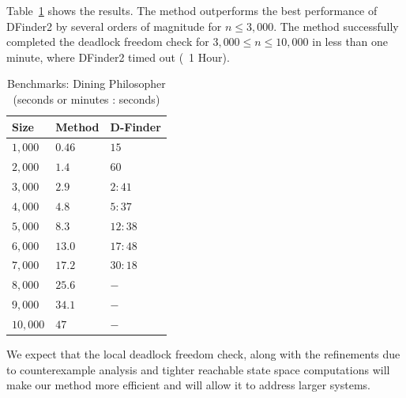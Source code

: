 Table~\ref{bench:dining} shows the results. 
The method outperforms the best performance of 
DFinder2 by several orders of magnitude 
for $n\leq 3,000$. 
The method successfully completed the deadlock freedom 
check for $3,000 \leq n \leq 10,000$ 
in less than one minute, where DFinder2 timed out (~1 Hour). 

\begin{table}
\caption{Benchmarks: Dining Philosopher (seconds or minutes : seconds)}
  \begin{center}
{\normalsize	
\begin{tabular}{| l | l | l |}
\hline
  Size & Method &   D-Finder \\ \hline \hline
$1,000$ &         $0.46 $      & $15$ \\ \hline
$2,000$ &          $1.4 $      & $60$ \\ \hline
$3,000$ &          $2.9 $     & $2:41$ \\ \hline
$4,000$ &          $4.8 $     & $5:37$ \\ \hline
$5,000$ &          $8.3 $     & $12:38$ \\ \hline
$6,000$ &          $13.0 $     & $17:48$ \\ \hline
$7,000$ &          $17.2 $     & $30:18$ \\ \hline
$8,000$ &          $25.6 $     & $-$ \\ \hline
$9,000$ &          $34.1 $    & $-$ \\ \hline
$10,000$ &          $47 $     & $-$ \\ \hline 
\end{tabular}
}
  \end{center}
\label{bench:dining}
\end{table}

We expect that the local deadlock freedom check, along 
with the refinements due to counterexample analysis and 
tighter reachable state space computations will make our 
method more efficient and will allow it to address larger
systems. 






